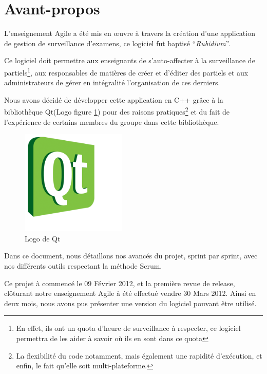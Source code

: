 \chapter*{Avant-propos}
L'enseignement Agile a été mis en \oe{}uvre à travers la création d'une application de gestion de 
surveillance d'examens, ce logiciel fut baptisé ``\textit{Rubidium}''.

Ce logiciel doit permettre aux enseignants de s'auto-affecter à la surveillance de partiels\footnote{
En effet, ils ont un quota d'heure de surveillance à respecter, ce logiciel permettra de les aider à savoir où ils en sont dans ce quota}, aux responsables de matières de créer et d'éditer des partiels et aux administrateurs de gérer en intégralité l'organisation de ces derniers.

Nous avons décidé de développer cette application en C++ grâce à la bibliothèque Qt(Logo figure \ref{fig:qt}) pour des raisons pratiques\footnote{La flexibilité du code notamment, mais également une rapidité d'exécution, et enfin, le fait qu'elle soit multi-plateforme.} et du fait de l'expérience de certains membres du groupe dans cette bibliothèque.
\begin{figure}[H]
	\begin{center}
		\includegraphics[width=5cm]{images/qt.png}
	\end{center}
	\caption{Logo de Qt}
	\label{fig:qt}
\end{figure}

Dans ce document, nous détaillons nos avancés du projet, sprint par sprint, avec nos différents outils 
respectant la méthode Scrum.

Ce projet à commencé le 09 Février 2012, et la première revue de release, clôturant notre enseignement
Agile à été effectué vendre 30 Mars 2012. Ainsi en deux mois, nous avons pus présenter une version
du logiciel pouvant être utilisé.

